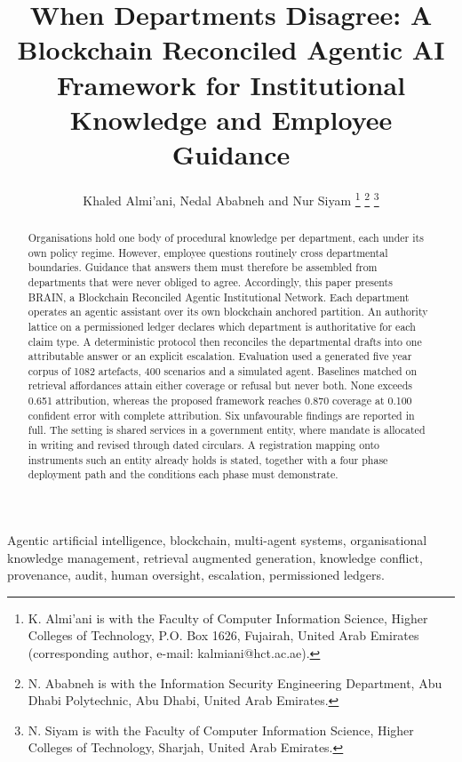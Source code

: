 \documentclass[journal]{IEEEtran}
\begin{document}
\raggedbottom

\title{When Departments Disagree: A Blockchain Reconciled Agentic AI Framework for Institutional Knowledge and Employee Guidance}

\author{Khaled Almi'ani, Nedal Ababneh and Nur Siyam%
\thanks{K. Almi'ani is with the Faculty of Computer Information Science, Higher Colleges of Technology, P.O. Box 1626, Fujairah, United Arab Emirates (corresponding author, e-mail: kalmiani@hct.ac.ae).}%
\thanks{N. Ababneh is with the Information Security Engineering Department, Abu Dhabi Polytechnic, Abu Dhabi, United Arab Emirates.}%
\thanks{N. Siyam is with the Faculty of Computer Information Science, Higher Colleges of Technology, Sharjah, United Arab Emirates.}}

\maketitle

\begin{abstract}
Organisations hold one body of procedural knowledge per department, each under its own policy regime. However, employee questions routinely cross departmental boundaries. Guidance that answers them must therefore be assembled from departments that were never obliged to agree. Accordingly, this paper presents BRAIN, a Blockchain Reconciled Agentic Institutional Network. Each department operates an agentic assistant over its own blockchain anchored partition. An authority lattice on a permissioned ledger declares which department is authoritative for each claim type. A deterministic protocol then reconciles the departmental drafts into one attributable answer or an explicit escalation. Evaluation used a generated five year corpus of 1082 artefacts, 400 scenarios and a simulated agent. Baselines matched on retrieval affordances attain either coverage or refusal but never both. None exceeds 0.651 attribution, whereas the proposed framework reaches 0.870 coverage at 0.100 confident error with complete attribution. Six unfavourable findings are reported in full. The setting is shared services in a government entity, where mandate is allocated in writing and revised through dated circulars. A registration mapping onto instruments such an entity already holds is stated, together with a four phase deployment path and the conditions each phase must demonstrate.
\end{abstract}

\begin{IEEEkeywords}
Agentic artificial intelligence, blockchain, multi-agent systems, organisational knowledge management, retrieval augmented generation, knowledge conflict, provenance, audit, human oversight, escalation, permissioned ledgers.
\end{IEEEkeywords}
\end{document}
